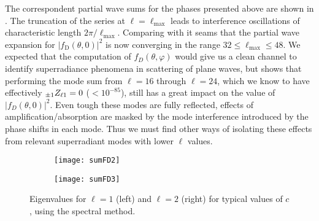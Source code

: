 The correspondent partial wave sums for the phases presented above are shown in .
The truncation of the series  at $\ell=\ell_\mathrm{max}$ leads to interference oscillations of characteristic length $2\pi/\ell_\mathrm{max}$.
Comparing with  it seams that the partial wave expansion for $|f_\mathrm{D}(\theta,0)|^2$ is now converging in the range $32 \le \ell_\mathrm{max} \le 48$.
We expected that the computation of $f_D(\theta, \varphi)$ would give us a clean channel to identify superradiance phenomena in scattering of plane waves, but  shows that performing the mode sum from $\ell=16$ through $\ell=24$, which we know to have effectively $\uu[\pm 1]{Z}{\ell 1}=0$ ($<10^{-85}$), still has a great impact on the value of $|f_D(\theta,0)|^2$.
Even tough these modes are fully reflected, effects of amplification/absorption are masked by the mode interference introduced by the phase shifts in each mode.
Thus we must find other ways of isolating these effects from relevant superradiant modes with lower $\ell$ values.
\begin{figure}[h]
	\centering
	\vspace{0.2cm}
	\begin{subfigure}[c]{0.49\textwidth}
        \texttt{[image: sumFD2]}
    \end{subfigure}
    \hfill
    \begin{subfigure}[c]{0.48\textwidth}
        \texttt{[image: sumFD3]}
    \end{subfigure}
    \hfill
	\caption{Eigenvalues for $\ell=1$ (left) and $\ell=2$ (right) for typical values of $c$, using the spectral method.}
	\label{fig5:fD}
\end{figure}

\cleardoublepage